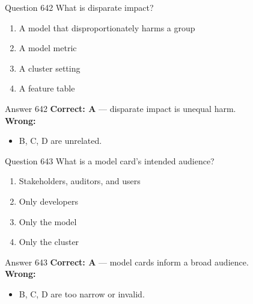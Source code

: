 \documentclass[aspectratio=169,11pt]{beamer}
\begin{document}
	\begin{frame}{Question 642}
		What is disparate impact?
		\begin{enumerate}[label=\Alph*.]
			\item A model that disproportionately harms a group
			\item A model metric
			\item A cluster setting
			\item A feature table
		\end{enumerate}
	\end{frame}
	\begin{frame}{Answer 642}
		\textbf{Correct: A} --- disparate impact is unequal harm.\\
		\vspace{0.5em}
		\textbf{Wrong:}
		\begin{itemize}
			\item B, C, D are unrelated.
		\end{itemize}
	\end{frame}
	
	\begin{frame}{Question 643}
		What is a model card's intended audience?
		\begin{enumerate}[label=\Alph*.]
			\item Stakeholders, auditors, and users
			\item Only developers
			\item Only the model
			\item Only the cluster
		\end{enumerate}
	\end{frame}
	\begin{frame}{Answer 643}
		\textbf{Correct: A} --- model cards inform a broad audience.\\
		\vspace{0.5em}
		\textbf{Wrong:}
		\begin{itemize}
			\item B, C, D are too narrow or invalid.
		\end{itemize}
	\end{frame}
	
\end{document}
